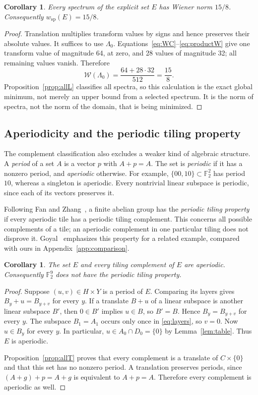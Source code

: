 \documentclass[11pt]{article}
\numberwithin{equation}{section}
\newtheorem{corollary}[theorem]{Corollary}
\theoremstyle{definition}
\theoremstyle{remark}\newtheorem{remark}[theorem]{Remark}
\newcommand{\F}{\mathbb F_2}
\newcommand{\W}{\mathcal W}
\newcommand{\wsp}{w_{\mathrm{sp}}}
\begin{document}
\begin{corollary}\label{cor:norm}
Every spectrum of the explicit set $E$ has Wiener norm $15/8$. Consequently $\wsp(E)=15/8$.
\end{corollary}
\begin{proof}
Translation multiplies transform values by signs and hence preserves their absolute values. It suffices to use $\Lambda_0$. Equations~\eqref{eq:WC}--\eqref{eq:productW} give one transform value of magnitude 64, at zero, and 28 values of magnitude 32; all remaining values vanish. Therefore
\[
 \W(\Lambda_0)=\frac{64+28\cdot32}{512}=\frac{15}{8}.
\]
Proposition~\ref{prop:allL} classifies all spectra, so this calculation is the exact global minimum, not merely an upper bound from a selected spectrum. It is the norm of spectra, not the norm of the domain, that is being minimized.
\end{proof}

\subsection{Aperiodicity and the periodic tiling property}\label{sec:periodic}
The complement classification also excludes a weaker kind of algebraic
structure. A \emph{period} of a set $A$ is a vector $p$ with $A+p=A$.
The set is \emph{periodic} if it has a nonzero period, and
\emph{aperiodic} otherwise. For example, $\{00,10\}\subset\F^2$
has period $10$, whereas a singleton is aperiodic. Every nontrivial
linear subspace is periodic, since each of its vectors preserves it.

Following Fan and Zhang~\cite{FZ}, a finite abelian group has the
\emph{periodic tiling property} if every aperiodic tile has a periodic
tiling complement. This concerns all possible complements of a tile;
an aperiodic complement in one particular tiling does not disprove it.
Goyal~\cite{Goyal} emphasizes this property for a related example,
compared with ours in Appendix~\ref{app:comparison}.

\begin{corollary}\label{cor:PT}
The set $E$ and every tiling complement of $E$ are aperiodic.
Consequently $\F^9$ does not have the periodic tiling property.
\end{corollary}
\begin{proof}
Suppose $(u,v)\in H\times Y$ is a period of $E$. Comparing its layers gives
$B_y+u=B_{y+v}$ for every $y$. If a translate $B+u$ of a linear subspace
is another linear subspace $B'$, then $0\in B'$ implies $u\in B$,
so $B'=B$. Hence $B_y=B_{y+v}$ for every $y$.
The subspace $B_1=A_1$ occurs only once in \eqref{eq:layers}, so $v=0$.
Now $u\in B_y$ for every $y$. In particular,
$u\in A_0\cap D_0=\{0\}$ by Lemma~\ref{lem:table}. Thus $E$ is aperiodic.

Proposition~\ref{prop:allT} proves that every complement is a translate
of $C\times\{0\}$ and that this set has no nonzero period.
A translation preserves periods, since $(A+g)+p=A+g$ is equivalent
to $A+p=A$. Therefore every complement is aperiodic as well.
\end{proof}
\end{document}
